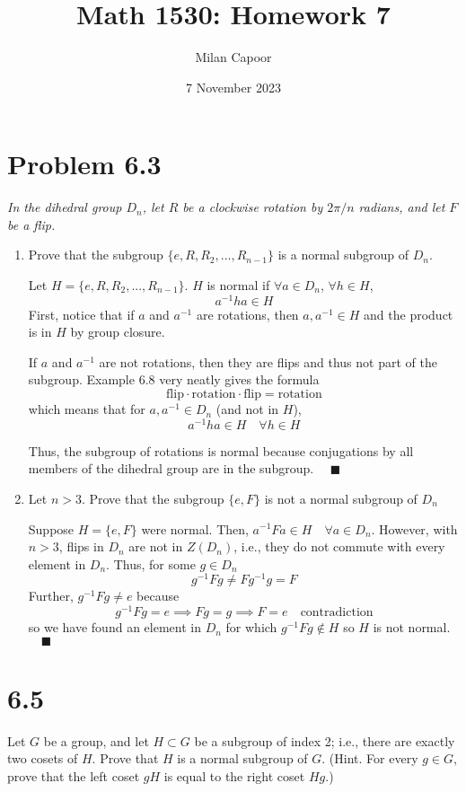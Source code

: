 \documentclass[12pt]{article}
\title{Math 1530: Homework 7}
\author{Milan Capoor}
\date{7 November 2023}
\newcommand{\qed}{\quad \blacksquare}
\begin{document}
\maketitle
\section*{Problem 6.3}
\emph{In the dihedral group $D_n$, let $R$ be a clockwise rotation by $2\pi/n$ radians, and
let $F$ be a flip.}
\begin{enumerate}[label=(\alph*)]
    \item Prove that the subgroup $\{e, R, R_2, ..., R_{n-1}\}$ is a normal subgroup of $D_n$.
    
        \color{blue}
            Let $H = \{e, R, R_2, ..., R_{n-1}\}$. $H$ is normal if $\forall a \in D_n$, $\forall h \in H$,  
            \[a^{-1}ha \in H\] 
            First, notice that if $a$ and $a^{-1}$ are rotations, then $a, a^{-1}\in H$ and the product is in $H$ by group closure. 
            
            If $a$ and $a^{-1}$ are not rotations, then they are flips and thus not part of the subgroup. Example 6.8 very neatly gives the formula 
            \[\text{flip} \cdot \text{rotation} \cdot \text{flip} = \text{rotation}\]
            which means that for $a, a^{-1} \in D_n$ (and not in $H$), 
            \[a^{-1}ha \in H \quad \forall h\in H\]

            Thus, the subgroup of rotations is normal because conjugations by all members of the dihedral group are in the subgroup. $\qed$
        \color{black}

    \item Let $n > 3$. Prove that the subgroup $\{e, F\}$ is not a normal subgroup of $D_n$
    
        \color{blue}
            Suppose $H = \{e, F\}$ were normal. Then, $a^{-1}Fa \in H \quad \forall a\in D_n$. However, with $n > 3$, flips in $D_n$ are not in $Z(D_n)$, i.e., they do not commute with every element in $D_n$. Thus, for some $g \in D_n$
            \[g^{-1}Fg \neq Fg^{-1}g = F\]
            Further, $g^{-1}Fg \neq e$ because 
            \[g^{-1}Fg = e \implies Fg = g \implies F = e \quad \text{contradiction}\]
            so we have found an element in $D_n$ for which $g^{-1}Fg \not \in H$ so $H$ is not normal. $\qed$
        \color{black}
\end{enumerate}

\pagebreak
\section*{6.5}
Let $G$ be a group, and let $H \subset G$ be a subgroup of index 2; i.e., there are
exactly two cosets of $H$. Prove that $H$ is a normal subgroup of $G$. (Hint. For every $g \in G$, prove that the left coset $gH$ is equal to the right coset $Hg$.)
\end{document}
